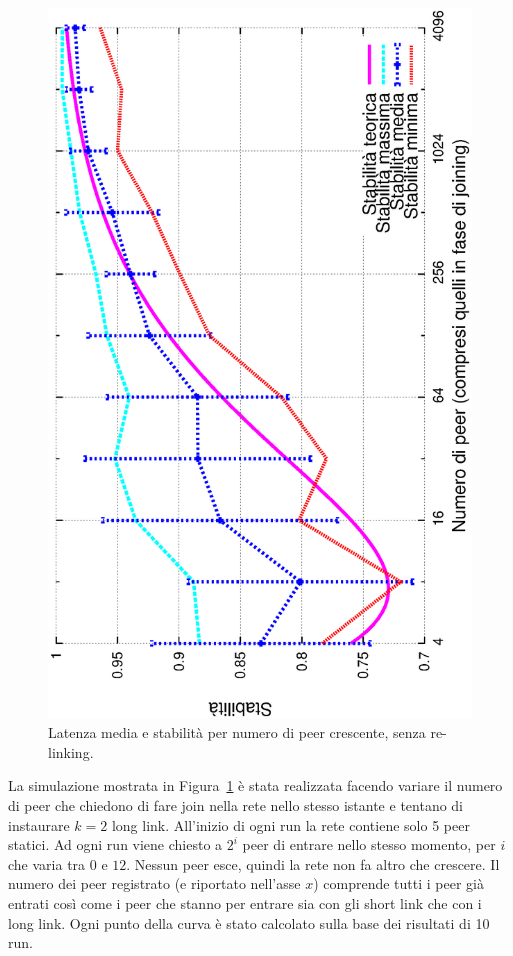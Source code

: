 \documentclass[prodmode,acmtap]{acmlarge}
\begin{document}
\begin{figure}
\includegraphics[scale=.32, angle=-90]{imgs/norelink-conc-stability2-stab.eps}
\caption{Latenza media e stabilità per numero di peer crescente, senza re-linking.}
\label{img:norelink-conc}
\end{figure}

La simulazione mostrata in Figura~\ref{img:norelink-conc} è stata realizzata facendo variare il numero di peer che chiedono di fare join nella rete nello stesso istante e tentano di instaurare $k=2$ long link. All'inizio di ogni run la rete contiene solo 5 peer statici. Ad ogni run viene chiesto a $2^{i}$ peer di entrare nello stesso momento, per $i$ che varia tra $0$ e $12$. Nessun peer esce, quindi la rete non fa altro che crescere. Il numero dei peer registrato (e riportato nell'asse $x$) comprende tutti i peer già entrati così come i peer che stanno per entrare sia con gli short link che con i long link. Ogni punto della curva è stato calcolato sulla base dei risultati di 10 run.
\end{document}
